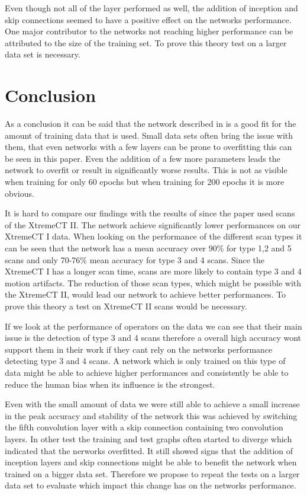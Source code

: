 \documentclass[
a4paper, 
12pt,
grayscalebody, %
abstract=on,
twoside, BCOR10mm, 12pt, DIV13,headinclude, footexclude, final, abstracton, openright
]{ibireprt}
\numberwithin{equation}{chapter}
\numberwithin{table}{chapter}
\numberwithin{figure}{chapter}
\numberwithin{algorithm}{chapter}
\numberwithin{example}{chapter}
\numberwithin{example}{chapter}
\begin{document}
Even though not all of the layer performed as well, the addition of inception and skip connections seemed to have a positive effect on the networks performance. One major contributor to the networks not reaching higher performance can be attributed to the size of the training set. To prove this theory test on a larger data set is necessary. 

\chapter{Conclusion}
As a conclusion it can be said that the network described in \cite{Walle2023} is a good fit for the amount of training data that is used. Small data sets often bring the issue with them, that even networks with a few layers can be prone to overfitting this can be seen in this paper. Even the addition of a few more parameters leads the network to overfit or result in significantly worse results. This is not as visible when training for only 60 epochs but when training for 200 epochs it is more obvious.

It is hard to compare our findings with the results of \cite{Walle2023} since the paper used scans of the XtremeCT II. The network achieve significantly lower performances on our XtremeCT I data. When looking on the performance of the different scan types it can be seen that the network has a mean accuracy over 90\% for type 1,2 and 5 scans and only 70-76\% mean accuracy for type 3 and 4 scans. Since the XtremeCT I has a longer scan time, scans are more likely to contain type 3 and 4 motion artifacts. The reduction of those scan types, which might be possible with the XtremeCT II,  would lead our network to achieve better performances.  To prove this theory a test on XtremeCT II scans would be necessary. 

If we look at the performance of operators on the data we can see that their main issue is the detection of type 3 and 4 scans therefore a overall high accuracy wont support them in their work if they cant rely on the networks performance detecting type 3 and 4 scans. A network which is only trained on this type of data might be able to achieve higher performances and consistently be able to reduce the human bias when its influence is the strongest. 

Even with the small amount of data we were still able to achieve a small increase in the peak accuracy and stability of the network this was achieved by switching the fifth convolution layer with a skip connection containing two convolution layers. In other test the training and test graphs often started to diverge which indicated that the nerworks overfitted. It still showed signs that the addition of inception layers and skip connections might be able to benefit the network when trained on a bigger data set. Therefore we propose to repeat the tests on a larger data set to evaluate which impact this change has on the networks performance. 




\end{document}
